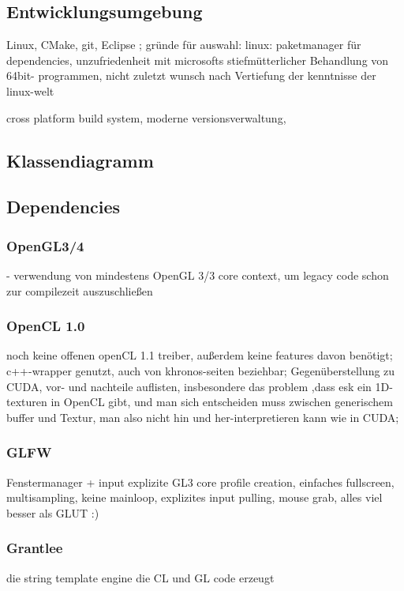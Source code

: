 
\label{sec:systemArchitecture}

\subsection{Entwicklungsumgebung}

	Linux, CMake, git, Eclipse ; 
	gründe für auswahl:
		linux:  paketmanager für dependencies, unzufriedenheit mit microsofts stiefmütterlicher Behandlung von 64bit-		
			programmen, nicht zuletzt wunsch nach Vertiefung der kenntnisse der linux-welt
	
	cross platform build system, moderne versionsverwaltung, 	
 

\subsection{Klassendiagramm}

\subsection{Dependencies}
	\label{sec:dependencies}

		
	\subsubsection{OpenGL3/4}
	- verwendung von mindestens OpenGL 3/3 core context, um legacy code schon zur compilezeit auszuschließen
    \subsubsection{OpenCL 1.0}
    	noch keine offenen openCL 1.1 treiber, außerdem keine features davon benötigt;
    	c++-wrapper genutzt, auch von khronos-seiten beziehbar;
    	Gegenüberstellung zu CUDA, vor- und nachteile auflisten, insbesondere das problem ,dass esk ein 1D-texturen in OpenCL gibt, und man sich entscheiden muss zwischen generischem buffer und Textur, man also nicht hin und her-interpretieren kann wie in CUDA;
    \subsubsection{GLFW}
    	Fenstermanager + input
    	explizite GL3 core profile creation, einfaches fullscreen, multisampling, keine mainloop, explizites input pulling, 
    	mouse grab, alles viel besser als GLUT :)
    \subsubsection{Grantlee}
       die string template engine die CL und GL code erzeugt
